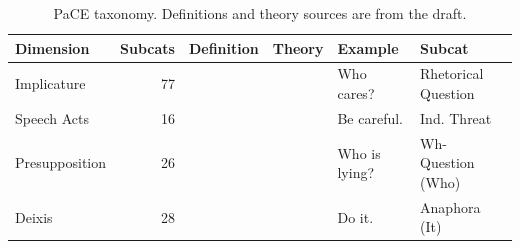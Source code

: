 \begin{table}[t]
\centering
\small
\setlength{\tabcolsep}{4pt}
\begin{tabular}{l r p{4.3cm} p{2.6cm} p{3.4cm} p{2.6cm}}
\toprule
Dimension & Subcats & Definition & Theory & Example & Subcat \\
\midrule
Implicature & 77 &  &  & Who cares? & Rhetorical Question \\
Speech Acts & 16 &  &  & Be careful. & Ind. Threat \\
Presupposition & 26 &  &  & Who is lying? & Wh- Question (Who) \\
Deixis & 28 &  &  & Do it. & Anaphora (It) \\
\bottomrule
\end{tabular}
\caption{PaCE taxonomy. Definitions and theory sources are from the draft.}
\label{tab:pace-taxonomy}
\end{table}
